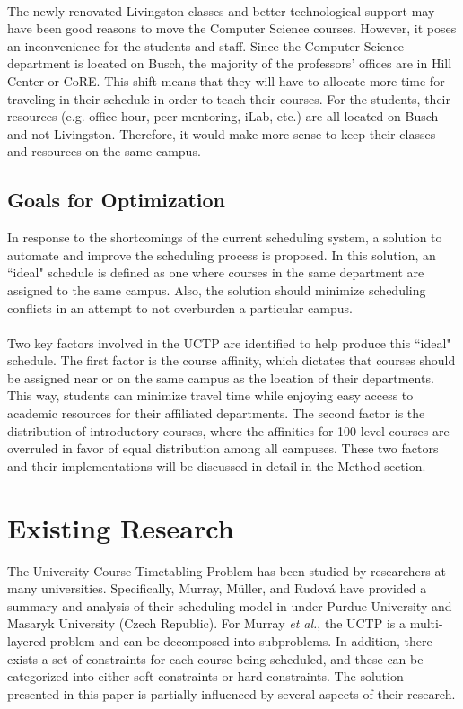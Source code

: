 \documentclass[12pt]{article}
\begin{document}
\hfill\\
The newly renovated Livingston classes and better technological support may have been good reasons to move the Computer Science courses. However, it poses an inconvenience for the students and staff. Since the Computer Science department is located on Busch, the majority of the professors' offices are in Hill Center or CoRE. This shift means that they will have to allocate more time for traveling in their schedule in order to teach their courses. For the students, their resources (e.g. office hour, peer mentoring, iLab, etc.) are all located on Busch and not Livingston. Therefore, it would make more sense to keep their classes and resources on the same campus. 

\subsection{Goals for Optimization}
In response to the shortcomings of the current scheduling system, a solution to automate and improve the scheduling process is proposed. In this solution, an ``ideal" schedule is defined as one where courses in the same department are assigned to the same campus. Also, the solution should minimize scheduling conflicts in an attempt to not overburden a particular campus. 
\\\\
Two key factors involved in the UCTP are identified to help produce this ``ideal" schedule. The first factor is the course affinity, which dictates that courses should be assigned near or on the same campus as the location of their departments. This way, students can minimize travel time while enjoying easy access to academic resources for their affiliated departments. The second factor is the distribution of introductory courses, where the affinities for 100-level courses are overruled in favor of equal distribution among all campuses. These two factors and their implementations will be discussed in detail in the Method section.

\section{Existing Research}
The University Course Timetabling Problem has been studied by researchers at many universities. Specifically, Murray, M{\"u}ller, and Rudov{\'a} have provided a summary and analysis of their scheduling model in \cite{citation1} under Purdue University and Masaryk University (Czech Republic). For Murray \emph{et al.}, the UCTP is a multi-layered problem and can be decomposed into subproblems. In addition, there exists a set of constraints for each course being scheduled, and these can be categorized into either soft constraints or hard constraints. The solution presented in this paper is partially influenced by several aspects of their research.
\end{document}

